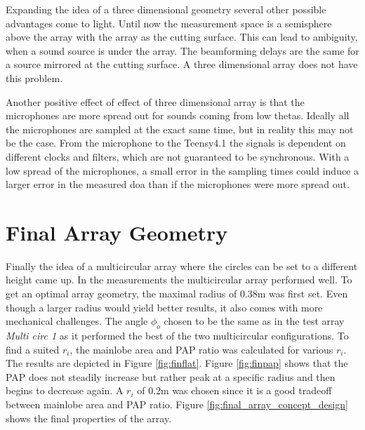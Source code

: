 Expanding the idea of a three dimensional geometry several other
possible advantages come to light.
Until now the measurement space is a semisphere above the array with the array as the cutting surface.
This can lead to ambiguity, when a sound source is under the array.
The beamforming delays are the same for a source mirrored at the cutting surface.
A three dimensional array does not have this problem.

Another positive effect of effect of three dimensional array is
that the microphones are more spread out for sounds
coming from low thetas.
Ideally all the microphones are sampled at the exact same time, but in
reality this may not be the case.
From the microphone to the Teensy4.1 the signals is dependent on different clocks and
filters, which are not guaranteed to be synchronous.
With a low spread of the microphones, a small error in the sampling times could
induce a larger error in the measured \acrshort*{doa} than if
the microphones were more spread out.


\newpage
\section{Final Array Geometry} \label{sec:final_array_geometry}
Finally the idea of a multicircular array where the circles can be
set to a different height came up.
In the measurements the multicircular array performed well.
To get an optimal array geometry, the maximal radius of 0.38m was first set.
Even though a larger radius would yield better results, it also
comes with more mechanical challenges.
The angle $\phi_o$ chosen to be the same as in the test array
\textit{Multi circ 1} as it performed the best of the two multicircular
configurations.
To find a suited $r_i$, the mainlobe area and PAP ratio was calculated for
various $r_i$.
The results are depicted in Figure \ref*{fig:finflat}.
Figure \ref{fig:finpap} shows that the PAP does not
steadily increase but rather peak at a specific radius and then
begins to decrease again.
A $r_i$ of 0.2m was chosen since it is a good tradeoff between
mainlobe area and PAP ratio.
Figure \ref*{fig:final_array_concept_design} shows the final
properties of the array.

